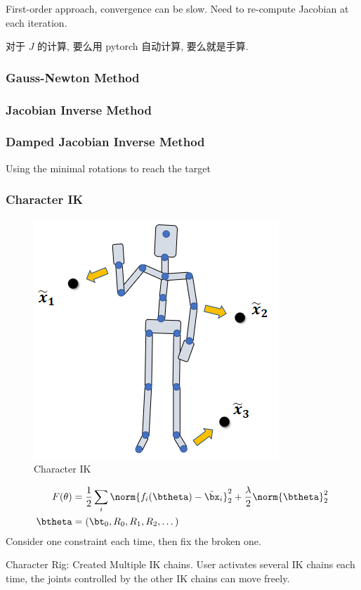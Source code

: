 First-order approach, convergence can be slow. Need to re-compute Jacobian at each iteration.

对于 $J$ 的计算, 要么用 pytorch 自动计算, 要么就是手算. 

\subsubsection{Gauss-Newton Method}

\subsubsection{Jacobian Inverse Method}

\subsubsection{Damped Jacobian Inverse Method}
Using the minimal rotations to reach the target

\subsubsection{Character IK}

\begin{figure}[!htb]
    \centering
    \includegraphics[width=0.42\linewidth]{pic/1053/Character IK}
    \caption{Character IK}
\end{figure}

\begin{align*}
    F(\theta)&=\frac{1}{2}\sum_i \norm{f_i(\btheta)-\tilde{\bx}_i}_2^2+\frac{\lambda}{2}\norm{\btheta}_2^2\\
    \btheta&=(\bt_0, R_0, R_1, R_2,\dots)
\end{align*}
Consider one constraint each time, then fix the broken one. 

Character Rig: Created Multiple IK chains. User activates several IK chains each time, the joints controlled by the other IK chains can move freely.


